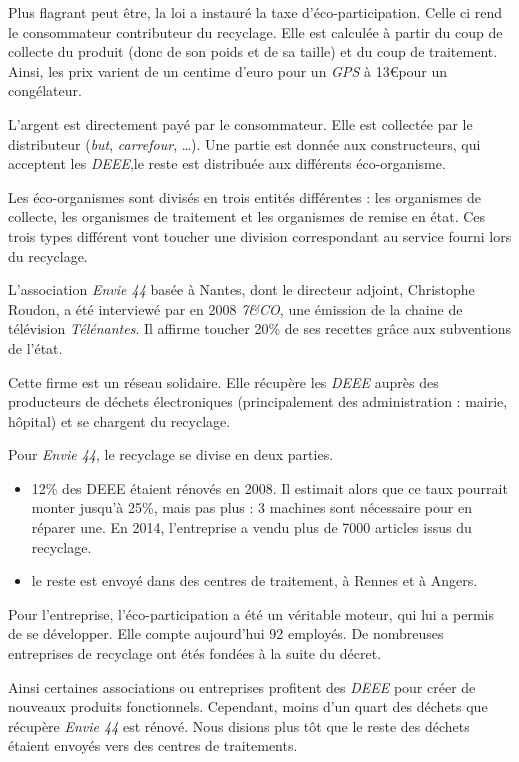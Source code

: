 Plus flagrant peut être, la loi a instauré la taxe d'éco-participation. Celle ci rend le consommateur contributeur du recyclage. Elle est calculée à partir du coup de collecte du produit (donc de son poids et de sa taille) et du coup de traitement. Ainsi, les prix varient de un centime d'euro pour un \textit{GPS} à 13\euro pour un congélateur. 

L'argent est directement payé par le consommateur. Elle est collectée par le distributeur (\textit{but}, \textit{carrefour}, \dots). Une partie est donnée aux constructeurs, qui acceptent les \textit{DEEE},le reste est distribuée aux différents éco-organisme. 

Les éco-organismes sont divisés en trois entités différentes : les organismes de collecte, les organismes de traitement et les organismes de remise en état. Ces trois types différent vont toucher une division correspondant au service fourni lors du recyclage. 

\medbreak

L'association \textit{Envie 44} basée à Nantes, dont le directeur adjoint, Christophe Roudon, a été interviewé par en 2008 \textit{7\&CO}, une émission de la chaine de télévision \textit{Télénantes}\cite{7andco}. Il affirme toucher 20\% de ses recettes grâce aux subventions de l'état. 

Cette firme est un réseau solidaire. Elle récupère les \textit{DEEE} auprès des producteurs de déchets électroniques (principalement des administration : mairie, hôpital) et se chargent du recyclage. 

Pour \textit{Envie 44}, le recyclage se divise en deux parties. 
\begin{itemize}
\item 12\% des DEEE étaient rénovés en 2008. Il estimait alors que ce taux pourrait monter jusqu'à 25\%, mais pas plus : 3 machines sont nécessaire pour en réparer une. En 2014, l'entreprise a vendu plus de 7000 articles issus du recyclage. 
\item le reste est envoyé dans des centres de traitement, à Rennes et à Angers.
\end{itemize}

Pour l'entreprise, l'éco-participation a été un véritable moteur, qui lui a permis de se développer. Elle compte aujourd'hui 92 employés. De nombreuses entreprises de recyclage ont étés fondées à la suite du décret. 


\bigbreak

Ainsi certaines associations ou entreprises profitent des \textit{DEEE} pour créer de nouveaux produits fonctionnels. Cependant, moins d'un quart des déchets que récupère \textit{Envie 44} est rénové. Nous disions plus tôt que le reste des déchets étaient envoyés vers  des centres de traitements. 

